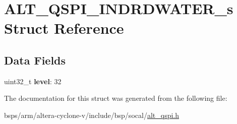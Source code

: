\hypertarget{structALT__QSPI__INDRDWATER__s}{}\section{A\+L\+T\+\_\+\+Q\+S\+P\+I\+\_\+\+I\+N\+D\+R\+D\+W\+A\+T\+E\+R\+\_\+s Struct Reference}
\label{structALT__QSPI__INDRDWATER__s}
\subsection*{Data Fields}
\begin{DoxyCompactItemize}
\item 
\mbox{\label{structALT__QSPI__INDRDWATER__s_ad4e747ad60784924bf30347d6b35f2f2}} 
uint32\+\_\+t {\bfseries level}\+: 32
\end{DoxyCompactItemize}


The documentation for this struct was generated from the following file\+:\begin{DoxyCompactItemize}
\item 
bsps/arm/altera-\/cyclone-\/v/include/bsp/socal/\mbox{\hyperlink{include_2bsp_2socal_2alt__qspi_8h}{alt\+\_\+qspi.\+h}}\end{DoxyCompactItemize}

